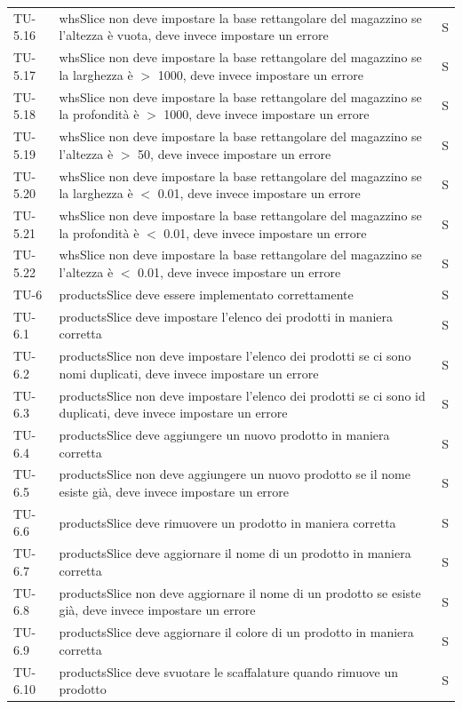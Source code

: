 \begin{xltabular}{0.9\textwidth}{X | p{0.6\textwidth} | p{0.1\textwidth} }
    TU-5.16 & whsSlice non deve impostare la base rettangolare del magazzino se l'altezza è vuota, deve invece impostare un errore & S\\
    TU-5.17 & whsSlice non deve impostare la base rettangolare del magazzino se la larghezza è $>$ 1000, deve invece impostare un errore & S\\
    TU-5.18 & whsSlice non deve impostare la base rettangolare del magazzino se la profondità è $>$ 1000, deve invece impostare un errore & S\\
    TU-5.19 & whsSlice non deve impostare la base rettangolare del magazzino se l'altezza è $>$ 50, deve invece impostare un errore & S\\
    TU-5.20 & whsSlice non deve impostare la base rettangolare del magazzino se la larghezza è $<$ 0.01, deve invece impostare un errore & S\\
    TU-5.21 & whsSlice non deve impostare la base rettangolare del magazzino se la profondità è $<$ 0.01, deve invece impostare un errore & S\\
    TU-5.22 & whsSlice non deve impostare la base rettangolare del magazzino se l'altezza è $<$ 0.01, deve invece impostare un errore & S\\
    
    TU-6 & productsSlice deve essere implementato correttamente & S\\
    TU-6.1 & productsSlice deve impostare l'elenco dei prodotti in maniera corretta & S\\
    TU-6.2 & productsSlice non deve impostare l'elenco dei prodotti se ci sono nomi duplicati, deve invece impostare un errore & S\\
    TU-6.3 & productsSlice non deve impostare l'elenco dei prodotti se ci sono id duplicati, deve invece impostare un errore & S\\
    TU-6.4 & productsSlice deve aggiungere un nuovo prodotto in maniera corretta & S\\
    TU-6.5 & productsSlice non deve aggiungere un nuovo prodotto se il nome esiste già, deve invece impostare un errore & S\\
    TU-6.6 & productsSlice deve rimuovere un prodotto in maniera corretta & S\\
    TU-6.7 & productsSlice deve aggiornare il nome di un prodotto in maniera corretta & S\\
    TU-6.8 & productsSlice non deve aggiornare il nome di un prodotto se esiste già,
    deve invece impostare un errore & S\\
    TU-6.9 & productsSlice deve aggiornare il colore di un prodotto in maniera corretta & S\\
    TU-6.10 & productsSlice deve svuotare le scaffalature quando rimuove un prodotto & S\\


\end{xltabular}
